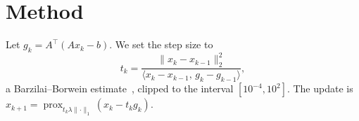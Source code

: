\section{Method}
\label{sec:method}

Let $g_k = A^\top(Ax_k - b)$. We set the step size to
\begin{equation}
  t_k = \frac{\lVert x_k - x_{k-1} \rVert_2^2}{\langle x_k - x_{k-1},\, g_k - g_{k-1} \rangle},
  \label{eq:bb}
\end{equation}
a Barzilai--Borwein estimate~\citep{barzilai1988}, clipped to the interval
$[10^{-4}, 10^{2}]$. The update is $x_{k+1} = \operatorname{prox}_{t_k \lambda \lVert\cdot\rVert_1}(x_k - t_k g_k)$.


